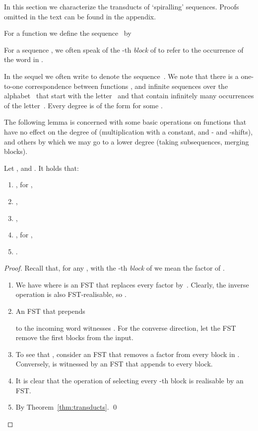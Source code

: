 
In this section we characterize the transducts of `spiralling' sequences.
Proofs omitted in the text can be found in the appendix.


\begin{definition}\label{def:seq}
  For a function  we define the sequence~
  by 
  \begin{center}
  \end{center}
  For a sequence , we often speak of the -th \emph{block} of  
  to refer to the occurrence of the word  in .
\end{definition}

In the sequel we often write 
 to denote the sequence~.
We note that there is a one-to-one correspondence between functions ,
and infinite sequences over the alphabet~ that start with the letter~ and that
contain infinitely many occurrences of the letter~.
Every degree is of the form 
for some .

The following lemma is concerned with some basic operations on functions
that have no effect on the degree of 
(multiplication with a constant, and - and -shifts),
and others by which we may go to a lower degree
(taking subsequences, merging blocks).

\begin{lemma}\label{lem:basic}
  Let , and .
  It holds that:
  \begin{enumerate}
    \item 
      \label{item:lem:basic:mult}
      , for ,
    \item 
      ,
      \label{item:lem:basic:xshift}
    \item 
      ,
      \label{item:lem:basic:yshift}
    \item 
      , for ,
      \label{item:lem:basic:sub}
    \item 
      .
      \label{item:lem:basic:merge}
  \end{enumerate}
\end{lemma}
\begin{proof}Recall that, for any ,
  with the -th \emph{block} of  we mean the factor  of .
  \begin{enumerate}
    \item 
      We have  where  is an FST that replaces 
      every factor  by~.
      Clearly, the inverse operation is also FST-realisable, so .
    \item 
      An FST that prepends 
      
      to the incoming word
      witnesses .
      For the converse direction, let the FST remove the first  blocks from the input.
    \item 
      To see that , 
      consider an FST that removes a factor  from every block in .
      Conversely,  is witnessed by an FST that appends  to every block.
    \item 
      It is clear that the operation of selecting every -th block is realisable by an FST.
    \item 
      By Theorem~\ref{thm:transducts}.
    \qed
  \end{enumerate}
\end{proof}


